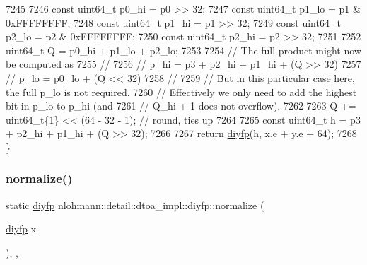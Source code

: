 \begin{DoxyCode}
7245 
7246         \textcolor{keyword}{const} uint64\_t p0\_hi = p0 >> 32;
7247         \textcolor{keyword}{const} uint64\_t p1\_lo = p1 & 0xFFFFFFFF;
7248         \textcolor{keyword}{const} uint64\_t p1\_hi = p1 >> 32;
7249         \textcolor{keyword}{const} uint64\_t p2\_lo = p2 & 0xFFFFFFFF;
7250         \textcolor{keyword}{const} uint64\_t p2\_hi = p2 >> 32;
7251 
7252         uint64\_t Q = p0\_hi + p1\_lo + p2\_lo;
7253 
7254         \textcolor{comment}{// The full product might now be computed as}
7255         \textcolor{comment}{//}
7256         \textcolor{comment}{// p\_hi = p3 + p2\_hi + p1\_hi + (Q >> 32)}
7257         \textcolor{comment}{// p\_lo = p0\_lo + (Q << 32)}
7258         \textcolor{comment}{//}
7259         \textcolor{comment}{// But in this particular case here, the full p\_lo is not required.}
7260         \textcolor{comment}{// Effectively we only need to add the highest bit in p\_lo to p\_hi (and}
7261         \textcolor{comment}{// Q\_hi + 1 does not overflow).}
7262 
7263         Q += uint64\_t\{1\} << (64 - 32 - 1); \textcolor{comment}{// round, ties up}
7264 
7265         \textcolor{keyword}{const} uint64\_t h = p3 + p2\_hi + p1\_hi + (Q >> 32);
7266 
7267         \textcolor{keywordflow}{return} \hyperlink{structnlohmann_1_1detail_1_1dtoa__impl_1_1diyfp_a23d25b3ad4527270a6e3f2a0bcca11e6}{diyfp}(h, x.e + y.e + 64);
7268     \}
\end{DoxyCode}
\mbox{\label{structnlohmann_1_1detail_1_1dtoa__impl_1_1diyfp_a2246b5b40c7c6992153ef174063d6aa6}} 
\subsubsection{\texorpdfstring{normalize()}{normalize()}}
{\footnotesize\ttfamily static \hyperlink{structnlohmann_1_1detail_1_1dtoa__impl_1_1diyfp}{diyfp} nlohmann\+::detail\+::dtoa\+\_\+impl\+::diyfp\+::normalize (\begin{DoxyParamCaption}\item[{\hyperlink{structnlohmann_1_1detail_1_1dtoa__impl_1_1diyfp}{diyfp}}]{x }\end{DoxyParamCaption})\hspace{0.3cm}{\ttfamily [inline]}, {\ttfamily [static]}, {\ttfamily [noexcept]}}



